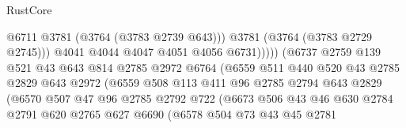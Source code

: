 \begin{lexlean}{RustCore}
\begin{coremodule}
                                          @6711
                                          @3781
                                          (@3764 (@3783 @2739 @643)))
                                        @3781
                                        (@3764 (@3783 @2729 @2745)))
                                      @4041
                                      @4044
                                      @4047
                                      @4051
                                      @4056
                                      @6731)))))
                            (@6737
                              @2759
                              @139
                              @521
                              @43
                              @643
                              @814
                              @2785
                              @2972
                              @6764
                              (@6559
                                @511
                                @440
                                @520
                                @43
                                @2785
                                @2829
                                @643
                                @2972
                                (@6559
                                  @508
                                  @113
                                  @411
                                  @96
                                  @2785
                                  @2794
                                  @643
                                  @2829
                                  (@6570
                                    @507
                                    @47
                                    @96
                                    @2785
                                    @2792
                                    @722
                                    (@6673
                                      @506
                                      @43
                                      @46
                                      @630
                                      @2784
                                      @2791
                                      @620
                                      @2765
                                      @627
                                      @6690
                                      (@6578
                                        @504
                                        @73
                                        @43
                                        @45
                                        @2781

\end{coremodule}
\end{lexlean}
